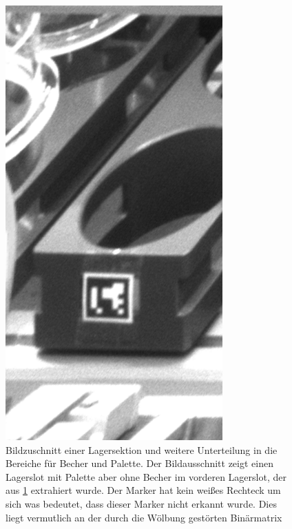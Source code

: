     \begin{figure}
        \caption[Bildzuschnitt auf einen Lagerplatz.]
        {\small Bildzuschnitt einer Lagersektion und weitere Unterteilung in die Bereiche für Becher und Palette. Der Bildausschnitt zeigt einen Lagerslot mit Palette aber ohne Becher im vorderen Lagerslot, der aus \ref{fig:figure15} extrahiert wurde. Der Marker hat kein weißes Rechteck um sich was bedeutet, dass dieser Marker nicht erkannt wurde. Dies liegt vermutlich an der durch die Wölbung gestörten Binärmatrix}\label{fig:figure15}
        \includegraphics*[width = \textwidth/3]{Bilder/section_16.png}
        \centering
    \end{figure}

